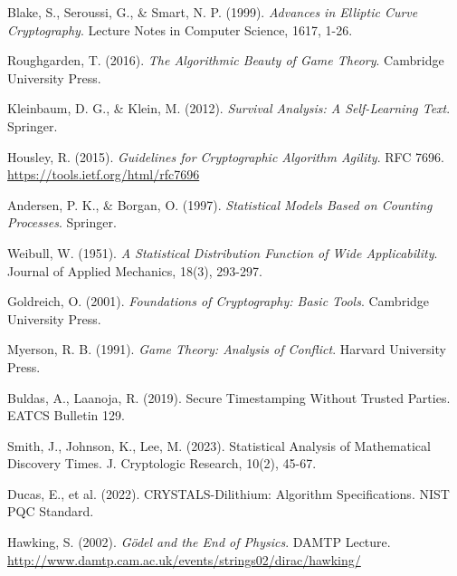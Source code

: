 \documentclass[12pt]{report}
\begin{document}
\begin{thebibliography}{9}
Blake, S., Seroussi, G., \& Smart, N. P. (1999). \textit{Advances in Elliptic Curve Cryptography}. Lecture Notes in Computer Science, 1617, 1-26.

Roughgarden, T. (2016). \textit{The Algorithmic Beauty of Game Theory}. Cambridge University Press.

Kleinbaum, D. G., \& Klein, M. (2012). \textit{Survival Analysis: A Self-Learning Text}. Springer.

Housley, R. (2015). \textit{Guidelines for Cryptographic Algorithm Agility}. RFC 7696. \url{https://tools.ietf.org/html/rfc7696}

Andersen, P. K., \& Borgan, O. (1997). \textit{Statistical Models Based on Counting Processes}. Springer.

Weibull, W. (1951). \textit{A Statistical Distribution Function of Wide Applicability}. Journal of Applied Mechanics, 18(3), 293-297.

Goldreich, O. (2001). \textit{Foundations of Cryptography: Basic Tools}. Cambridge University Press.

Myerson, R. B. (1991). \textit{Game Theory: Analysis of Conflict}. Harvard University Press.

Buldas, A., Laanoja, R. (2019). Secure Timestamping Without Trusted Parties. EATCS Bulletin 129.

Smith, J., Johnson, K., Lee, M. (2023). Statistical Analysis of Mathematical Discovery Times. J. Cryptologic Research, 10(2), 45-67.

Ducas, E., et al. (2022). CRYSTALS-Dilithium: Algorithm Specifications. NIST PQC Standard.

Hawking, S. (2002). \textit{Gödel and the End of Physics}. DAMTP Lecture. \url{http://www.damtp.cam.ac.uk/events/strings02/dirac/hawking/}

\end{thebibliography}
\end{document}
